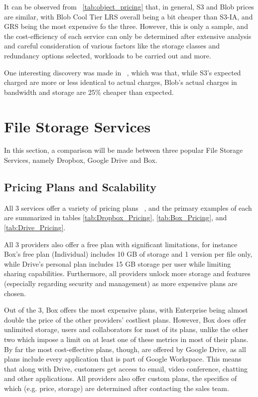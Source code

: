 It can be observed from ~\ref{tab:object_pricing} that, in general, S3 and Blob prices are similar, with Blob Cool Tier LRS overall being a bit cheaper than S3-IA, and GRS being the most expensive fo the three. However, this is only a sample, and the cost-efficiency of each service can only be determined after extensive analysis and careful consideration of various factors like the storage classes and redundancy options selected, workloads to be carried out and more.

One interesting discovery was made in ~\cite{s3vsblob_performance}, which was that, while S3's expected charged are more or less identical to actual charges, Blob's actual charges in bandwidth and storage are 25\% cheaper than expected.

\section{File Storage Services}
In this section, a comparison will be made between three popular File Storage Services, namely Dropbox, Google Drive and Box.

\subsection{Pricing Plans and Scalability}
All 3 services offer a variety of pricing plans  ~\cite{dropbox,google_drive,box}, and the primary examples of each are summarized in tables  \ref{tab:Dropbox_Pricing}, \ref{tab:Box_Pricing}, and \ref{tab:Drive_Pricing}.

All 3 providers also offer a free plan with significant limitations, for instance Box's free plan (Individual) includes 10 GB of storage and 1 version per file only, while Drive's personal plan includes 15 GB storage per user while limiting sharing capabilities. Furthermore, all providers unlock more storage and features (especially regarding security and management) as more expensive plans are chosen.

Out of the 3, Box offers the most expensive plans, with Enterprise being almost double the price of the other providers' costliest plans. However, Box does offer unlimited storage, users and collaborators for most of its plans, unlike the other two which impose a limit on at least one of these metrics in most of their plans.  By far the most cost-effective plans, though, are offered by Google Drive, as all plans include every application that is part of Google Workspace. This means that along with Drive, customers get access to email, video conference, chatting and other applications. All providers also offer custom plans, the specifics of which (e.g. price, storage) are determined after contacting the sales team.

